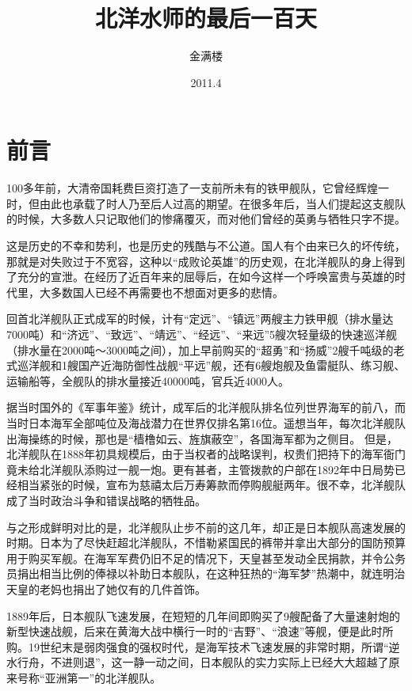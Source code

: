 \documentclass[12pt,UTF8]{ctexbook}
\title{\heiti\zihao{0} 北洋水师的最后一百天}
\author{金满楼}
\date{2011.4}
\begin{document}
\maketitle
\tableofcontents

\frontmatter

\chapter{前言}

100多年前，大清帝国耗费巨资打造了一支前所未有的铁甲舰队，它曾经辉煌一时，但由此也承载了时人乃至后人过高的期望。在很多年后，当人们提起这支舰队的时候，大多数人只记取他们的惨痛覆灭，而对他们曾经的英勇与牺牲只字不提。

这是历史的不幸和势利，也是历史的残酷与不公道。国人有个由来已久的坏传统，那就是对失败过于不宽容，这种以“成败论英雄”的历史观，在北洋舰队的身上得到了充分的宣泄。在经历了近百年来的屈辱后，在如今这样一个呼唤富贵与英雄的时代里，大多数国人已经不再需要也不想面对更多的悲情。

回首北洋舰队正式成军的时候，计有“定远”、“镇远”两艘主力铁甲舰（排水量达7000吨）和“济远”、“致远”、“靖远”、“经远”、“来远”5艘次轻量级的快速巡洋舰（排水量在2000吨～3000吨之间），加上早前购买的“超勇”和“扬威”2艘千吨级的老式巡洋舰和1艘国产近海防御性战舰“平远”舰，还有6艘炮舰及鱼雷艇队、练习舰、运输船等，全舰队的排水量接近40000吨，官兵近4000人。

据当时国外的《军事年鉴》统计，成军后的北洋舰队排名位列世界海军的前八，而当时日本海军全部吨位及海战潜力在世界仅排名第16位。遥想当年，每次北洋舰队出海操练的时候，那也是“樯橹如云、旌旗蔽空”，各国海军都为之侧目。
但是，北洋舰队在1888年初具规模后，由于当权者的战略误判，权贵们把持下的海军衙门竟未给北洋舰队添购过一舰一炮。更有甚者，主管拨款的户部在1892年中日局势已经相当紧张的时候，宣布为慈禧太后万寿筹款而停购舰艇两年。很不幸，北洋舰队成了当时政治斗争和错误战略的牺牲品。

与之形成鲜明对比的是，北洋舰队止步不前的这几年，却正是日本舰队高速发展的时期。日本为了尽快赶超北洋舰队，不惜勒紧国民的裤带并拿出大部分的国防预算用于购买军舰。在海军军费仍旧不足的情况下，天皇甚至发动全民捐款，并令公务员捐出相当比例的俸禄以补助日本舰队，在这种狂热的“海军梦”热潮中，就连明治天皇的老妈也捐出了她仅有的几件首饰。

1889年后，日本舰队飞速发展，在短短的几年间即购买了9艘配备了大量速射炮的新型快速战舰，后来在黄海大战中横行一时的“吉野”、“浪速”等舰，便是此时所购。19世纪末是弱肉强食的强权时代，是海军技术飞速发展的非常时期，所谓“逆水行舟，不进则退”，这一静一动之间，日本舰队的实力实际上已经大大超越了原来号称“亚洲第一”的北洋舰队。
\end{document}
